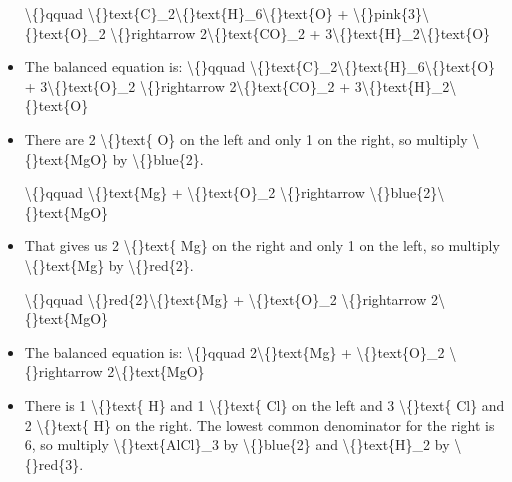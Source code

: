 \documentclass{article}
\begin{document}
\begin{itemize}
                    \textbackslash\{\}qquad
                        \textbackslash\{\}text\{C\}\_2\textbackslash\{\}text\{H\}\_6\textbackslash\{\}text\{O\} + \textbackslash\{\}pink\{3\}\textbackslash\{\}text\{O\}\_2 \textbackslash\{\}rightarrow 2\textbackslash\{\}text\{CO\}\_2 + 3\textbackslash\{\}text\{H\}\_2\textbackslash\{\}text\{O\}
  \item The balanced equation is:
                    \textbackslash\{\}qquad
                        \textbackslash\{\}text\{C\}\_2\textbackslash\{\}text\{H\}\_6\textbackslash\{\}text\{O\} + 3\textbackslash\{\}text\{O\}\_2 \textbackslash\{\}rightarrow 2\textbackslash\{\}text\{CO\}\_2 + 3\textbackslash\{\}text\{H\}\_2\textbackslash\{\}text\{O\}
  \item There are 2 \textbackslash\{\}text\{ O\} on the left and only
                        1 on the right, so multiply
                        \textbackslash\{\}text\{MgO\} by \textbackslash\{\}blue\{2\}.
                    
                    \textbackslash\{\}qquad
                        \textbackslash\{\}text\{Mg\} + \textbackslash\{\}text\{O\}\_2 \textbackslash\{\}rightarrow \textbackslash\{\}blue\{2\}\textbackslash\{\}text\{MgO\}
  \item That gives us 2 \textbackslash\{\}text\{ Mg\} on the right and
                        only 1 on the left, so multiply
                        \textbackslash\{\}text\{Mg\} by \textbackslash\{\}red\{2\}.
                    
                    \textbackslash\{\}qquad
                        \textbackslash\{\}red\{2\}\textbackslash\{\}text\{Mg\} + \textbackslash\{\}text\{O\}\_2 \textbackslash\{\}rightarrow 2\textbackslash\{\}text\{MgO\}
  \item The balanced equation is:
                    \textbackslash\{\}qquad
                        2\textbackslash\{\}text\{Mg\} + \textbackslash\{\}text\{O\}\_2 \textbackslash\{\}rightarrow 2\textbackslash\{\}text\{MgO\}
  \item There is 1 \textbackslash\{\}text\{ H\} and 1 \textbackslash\{\}text\{ Cl\} on the left and
                        3 \textbackslash\{\}text\{ Cl\} and 2 \textbackslash\{\}text\{ H\} on the right.
                        The lowest common denominator for the right is 6, so multiply
                        \textbackslash\{\}text\{AlCl\}\_3 by \textbackslash\{\}blue\{2\} and
                        \textbackslash\{\}text\{H\}\_2 by \textbackslash\{\}red\{3\}.
                    

\end{itemize}
\end{document}
